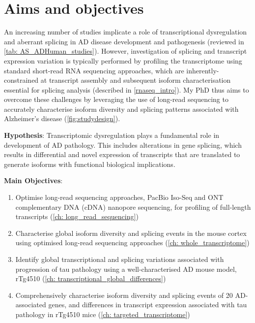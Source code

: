 \newpage
\section{Aims and objectives}
An increasing number of studies implicate a role of transcriptional dysregulation and aberrant splicing in AD disease development and pathogenesis (reviewed in \cref{tab: AS_ADHuman_studies}). However, investigation of splicing and transcript expression variation is typically performed by profiling the transcriptome using standard short-read RNA sequencing approaches, which are inherently-constrained at transcript assembly and subsequent isoform characterisation essential for splicing analysis (described in \cref{rnaseq_intro}). My PhD thus aims to overcome these challenges by leveraging the use of long-read sequencing to accurately characterise isoform diversity and splicing patterns associated with Alzheimer's disease (\cref{fig:studydesign}).


\textbf{Hypothesis}: Transcriptomic dysregulation plays a fundamental role in development of AD pathology. This includes alterations in gene splicing, which results in differential and novel expression of transcripts that are translated to generate isoforms with functional biological implications. 

\textbf{Main Objectives}:

\begin{enumerate}[]
	\item Optimise long-read sequencing approaches, PacBio Iso-Seq and ONT complementary DNA (cDNA) nanopore sequencing, for profiling of full-length transcripts (\cref{ch: long_read_sequencing}) 
	\item Characterise global isoform diversity and splicing events in the mouse cortex using optimised long-read sequencing approaches (\cref{ch: whole_transcriptome}) 
	\item Identify global transcriptional and splicing variations associated with progression of tau pathology using a well-characterised AD mouse model, rTg4510 (\cref{ch: transcriptional_global_differences})
	\item Comprehensively characterise isoform diversity and splicing events of 20 AD-associated genes, and differences in transcript expression associated with tau pathology in rTg4510 mice (\cref{ch: targeted_transcriptome})
\end{enumerate}


